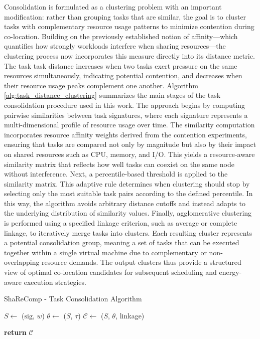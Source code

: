 Consolidation is formulated as a clustering problem with an important modification: rather than grouping tasks that are similar, the goal is to cluster tasks with complementary resource usage patterns to minimize contention during co-location. Building on the previously established notion of affinity—which quantifies how strongly workloads interfere when sharing resources—the clustering process now incorporates this measure directly into its distance metric. The task task distance increases when two tasks exert pressure on the same resources simultaneously, indicating potential contention, and decreases when their resource usage peaks complement one another.
Algorithm \ref{alg:task_distance_clustering} summarizes the main stages of the task consolidation procedure used in this work. The approach begins by computing pairwise similarities between task signatures, where each signature represents a multi-dimensional profile of resource usage over time. The similarity computation incorporates resource affinity weights derived from the contention experiments, ensuring that tasks are compared not only by magnitude but also by their impact on shared resources such as CPU, memory, and I/O. This yields a resource-aware similarity matrix that reflects how well tasks can coexist on the same node without interference.
Next, a percentile-based threshold is applied to the similarity matrix. This adaptive rule determines when clustering should stop by selecting only the most suitable task pairs according to the defined percentile. In this way, the algorithm avoids arbitrary distance cutoffs and instead adapts to the underlying distribution of similarity values.
Finally, agglomerative clustering is performed using a specified linkage criterion, such as average or complete linkage, to iteratively merge tasks into clusters. Each resulting cluster represents a potential consolidation group, meaning a set of tasks that can be executed together within a single virtual machine due to complementary or non-overlapping resource demands. The output clusters thus provide a structured view of optimal co-location candidates for subsequent scheduling and energy-aware execution strategies.

\begin{algorithm}[H]
    \caption{ShaReComp - Task Consolidation Algorithm}
    \label{alg:task_distance_clustering}


    $S \gets$ \Sim($\mathrm{sig}$, $w$) 
    $\theta \gets$ \Thresh($S$, $\tau$) 
    $\mathcal{C} \gets$ \Merge($S$, $\theta$, linkage) 

    \textbf{return } $\mathcal{C}$
\end{algorithm}

